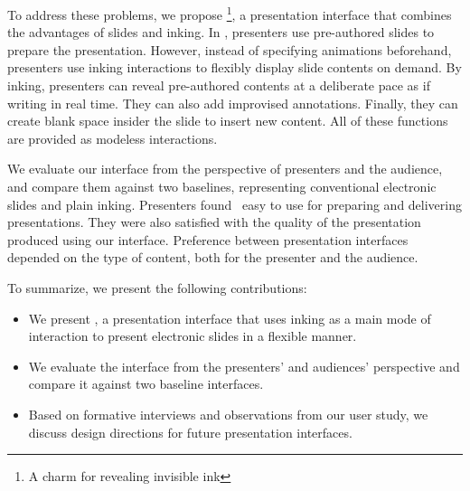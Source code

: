 To address these problems, we propose \interface \footnote{A charm for revealing invisible ink\cite{rowling1997harry}}, a presentation interface that combines the advantages of slides and inking.
%
In \interface, presenters use pre-authored slides to prepare the presentation. However, instead of specifying animations beforehand, presenters use inking interactions to flexibly display slide contents on demand. By inking, presenters can reveal pre-authored contents at a deliberate pace as if writing in real time. They can also add improvised annotations. Finally, they can create blank space insider the slide to insert new content. All of these functions are provided as modeless interactions.

We evaluate our interface from the perspective of presenters and the audience, and compare them against two baselines, representing conventional electronic slides and plain inking. Presenters found \interface\ easy to use for preparing and delivering presentations. They were also satisfied with the quality of the presentation produced using our interface. Preference between presentation interfaces depended on the type of content, both for the presenter and the audience.

To summarize, we present the following contributions: 
\begin{itemize}
  \item We present \interface, a presentation interface that uses inking as a main mode of interaction to present electronic slides in a flexible manner.
  \item We evaluate the interface from the presenters' and audiences' perspective and compare it against two baseline interfaces. 
  \item Based on formative interviews and observations from our user study, we discuss design directions for future presentation interfaces. 
\end{itemize}

